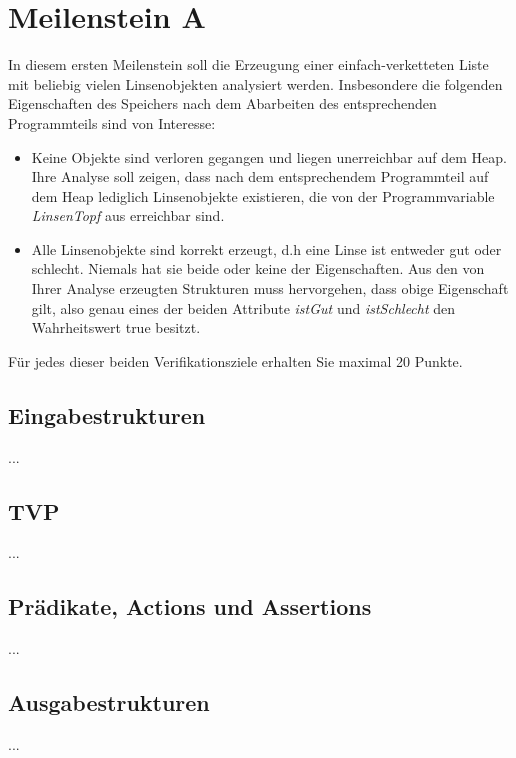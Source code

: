 \section{Meilenstein A}
In diesem ersten Meilenstein soll die Erzeugung einer einfach-verketteten Liste mit beliebig vielen Linsenobjekten analysiert werden. Insbesondere die folgenden Eigenschaften des Speichers nach dem Abarbeiten des entsprechenden Programmteils sind von Interesse:
\begin{itemize}
	\item Keine Objekte sind verloren gegangen und liegen unerreichbar auf dem Heap. Ihre Analyse soll zeigen, dass nach dem entsprechendem Programmteil auf dem Heap lediglich Linsenobjekte existieren, die von der Programmvariable \emph{LinsenTopf} aus erreichbar sind.
	\item Alle Linsenobjekte sind korrekt erzeugt, d.h eine Linse ist entweder gut oder schlecht. Niemals hat sie beide oder keine der Eigenschaften. Aus den von Ihrer Analyse erzeugten Strukturen muss hervorgehen, dass obige Eigenschaft gilt, also genau eines der beiden Attribute \emph{istGut} und \emph{istSchlecht} den Wahrheitswert true besitzt.
\end{itemize}
Für jedes dieser beiden Verifikationsziele erhalten Sie maximal 20 Punkte.


\subsection{Eingabestrukturen}
...


\subsection{TVP}
...


\subsection{Prädikate, Actions und Assertions}
...


\subsection{Ausgabestrukturen}
...